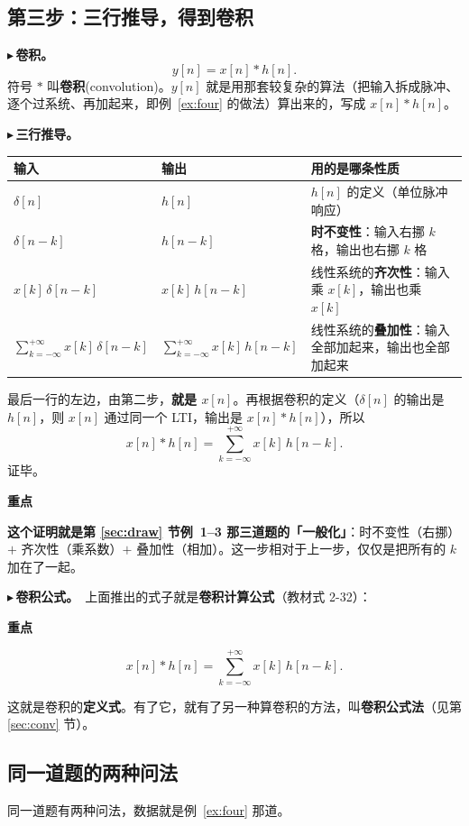 \documentclass[UTF8,a4paper,11pt]{ctexart}
\newenvironment{remember}{\begin{rememberbox}\textbf{重点}\par\smallskip}{\end{rememberbox}}
\newcounter{ex}[section]
\newcommand{\point}[1]{\par\addvspace{1ex}\noindent\textcolor{ptteal}{$\blacktriangleright$\,\textbf{#1}}\ }
\begin{document}
\subsection{第三步：三行推导，得到卷积}
\point{卷积。}\[y[n]=x[n]\ast h[n].\]
符号 $\ast$ 叫\textbf{卷积}(convolution)。$y[n]$ 就是用那套较复杂的算法（把输入拆成脉冲、逐个过系统、再加起来，即例~\ref{ex:four} 的做法）算出来的，写成 $x[n]\ast h[n]$。

\point{三行推导。}
\begin{center}
\begin{tabular}{@{}p{3.7cm}p{3.7cm}p{7.6cm}@{}}
\toprule
输入 & 输出 & 用的是哪条性质\\
\midrule
$\delta[n]$ & $h[n]$ & $h[n]$ 的定义（单位脉冲响应）\\
$\delta[n-k]$ & $h[n-k]$ & \textbf{时不变性}：输入右挪 $k$ 格，输出也右挪 $k$ 格\\
$x[k]\,\delta[n-k]$ & $x[k]\,h[n-k]$ & 线性系统的\textbf{齐次性}：输入乘 $x[k]$，输出也乘 $x[k]$\\
$\displaystyle\sum_{k=-\infty}^{+\infty}x[k]\,\delta[n-k]$ & $\displaystyle\sum_{k=-\infty}^{+\infty}x[k]\,h[n-k]$ & 线性系统的\textbf{叠加性}：输入全部加起来，输出也全部加起来\\
\bottomrule
\end{tabular}
\end{center}

最后一行的左边，由第二步，\textbf{就是 $x[n]$}。再根据卷积的定义（$\delta[n]$ 的输出是 $h[n]$，则 $x[n]$ 通过同一个 LTI，输出是 $x[n]\ast h[n]$），所以
\[
x[n]\ast h[n]=\sum_{k=-\infty}^{+\infty}x[k]\,h[n-k].
\]
证毕。

\begin{remember}
\textbf{这个证明就是第 \ref{sec:draw} 节例~1--3 那三道题的「一般化」}：时不变性（右挪）$+$ 齐次性（乘系数）$+$ 叠加性（相加）。这一步相对于上一步，仅仅是把所有的 $k$ 加在了一起。
\end{remember}

\point{卷积公式。}上面推出的式子就是\textbf{卷积计算公式}（教材式 2-32）：

\begin{remember}
\[
x[n]\ast h[n]=\sum_{k=-\infty}^{+\infty}x[k]\,h[n-k].
\]
\end{remember}
这就是卷积的\textbf{定义式}。有了它，就有了另一种算卷积的方法，叫\textbf{卷积公式法}（见第 \ref{sec:conv} 节）。

\subsection{同一道题的两种问法}
同一道题有两种问法，数据就是例~\ref{ex:four} 那道。
\end{document}
